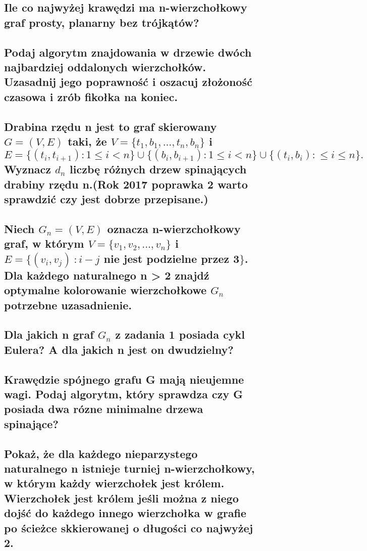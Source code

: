 \documentclass[12pt]{article}
\begin{document}
\subsection{Ile co najwyżej krawędzi ma n-wierzchołkowy graf prosty, planarny bez trójkątów?}

\subsection{Podaj algorytm znajdowania w drzewie dwóch najbardziej oddalonych wierzchołków. Uzasadnij jego poprawność i oszacuj złożoność czasowa i zrób fikołka na koniec.}

\subsection{Drabina rzędu n jest to graf skierowany $G = (V,E)$ taki, że $V=\{t_1,b_1,...,t_n,b_n\}$ i $E=\{(t_i,t_{i+1}) : 1 \leq i < n\} \cup \{(b_i,b_{i+1}) : 1 \leq i < n\} \cup \{(t_i,b_i) : \leq i \leq n\}.$ Wyznacz $d_n$ liczbę różnych drzew spinających drabiny rzędu n.(Rok 2017 poprawka 2 warto sprawdzić czy jest dobrze przepisane.)}

\subsection{Niech $G_n = (V,E)$ oznacza n-wierzchołkowy graf, w którym $V=\{v_1,v_2,...,v_n\}$ i $E=\{(v_i,v_j)\ : i-j$ nie jest podzielne przez 3$\}$. Dla każdego naturalnego n > 2 znajdź optymalne kolorowanie wierzchołkowe $G_n$ potrzebne uzasadnienie.}

\subsection{Dla jakich n graf $G_n$ z zadania 1 posiada cykl Eulera? A dla jakich n jest on dwudzielny?}

\subsection{Krawędzie spójnego grafu G mają nieujemne wagi. Podaj algorytm, który sprawdza czy G posiada dwa rózne minimalne drzewa spinające?}

\newpage

\subsection{Pokaż, że dla każdego nieparzystego naturalnego n istnieje turniej n-wierzchołkowy, w którym każdy wierzchołek jest królem. Wierzchołek jest królem jeśli można z niego dojść do każdego innego wierzchołka w grafie po ścieżce skkierowanej o długości co najwyżej 2.}
\end{document}
